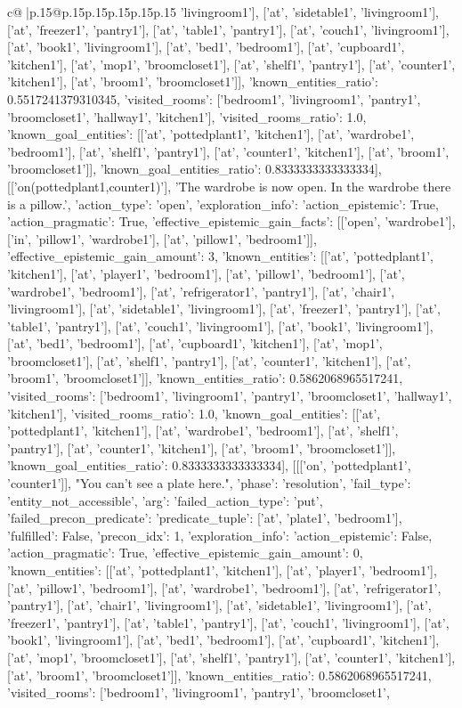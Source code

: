 \documentclass{article}
\begin{document}
{\begin{supertabular}{c@{$\;$}|p{.15\linewidth}@{}p{.15\linewidth}p{.15\linewidth}p{.15\linewidth}p{.15\linewidth}p{.15\linewidth}}
{{{'livingroom1'], ['at', 'sidetable1', 'livingroom1'], ['at', 'freezer1', 'pantry1'], ['at', 'table1', 'pantry1'], ['at', 'couch1', 'livingroom1'], ['at', 'book1', 'livingroom1'], ['at', 'bed1', 'bedroom1'], ['at', 'cupboard1', 'kitchen1'], ['at', 'mop1', 'broomcloset1'], ['at', 'shelf1', 'pantry1'], ['at', 'counter1', 'kitchen1'], ['at', 'broom1', 'broomcloset1']], 'known_entities_ratio': 0.5517241379310345, 'visited_rooms': ['bedroom1', 'livingroom1', 'pantry1', 'broomcloset1', 'hallway1', 'kitchen1'], 'visited_rooms_ratio': 1.0, 'known_goal_entities': [['at', 'pottedplant1', 'kitchen1'], ['at', 'wardrobe1', 'bedroom1'], ['at', 'shelf1', 'pantry1'], ['at', 'counter1', 'kitchen1'], ['at', 'broom1', 'broomcloset1']], 'known_goal_entities_ratio': 0.8333333333333334}}], [['on(pottedplant1,counter1)'], 'The wardrobe is now open. In the wardrobe there is a pillow.', {'action_type': 'open', 'exploration_info': {'action_epistemic': True, 'action_pragmatic': True, 'effective_epistemic_gain_facts': [['open', 'wardrobe1'], ['in', 'pillow1', 'wardrobe1'], ['at', 'pillow1', 'bedroom1']], 'effective_epistemic_gain_amount': 3, 'known_entities': [['at', 'pottedplant1', 'kitchen1'], ['at', 'player1', 'bedroom1'], ['at', 'pillow1', 'bedroom1'], ['at', 'wardrobe1', 'bedroom1'], ['at', 'refrigerator1', 'pantry1'], ['at', 'chair1', 'livingroom1'], ['at', 'sidetable1', 'livingroom1'], ['at', 'freezer1', 'pantry1'], ['at', 'table1', 'pantry1'], ['at', 'couch1', 'livingroom1'], ['at', 'book1', 'livingroom1'], ['at', 'bed1', 'bedroom1'], ['at', 'cupboard1', 'kitchen1'], ['at', 'mop1', 'broomcloset1'], ['at', 'shelf1', 'pantry1'], ['at', 'counter1', 'kitchen1'], ['at', 'broom1', 'broomcloset1']], 'known_entities_ratio': 0.5862068965517241, 'visited_rooms': ['bedroom1', 'livingroom1', 'pantry1', 'broomcloset1', 'hallway1', 'kitchen1'], 'visited_rooms_ratio': 1.0, 'known_goal_entities': [['at', 'pottedplant1', 'kitchen1'], ['at', 'wardrobe1', 'bedroom1'], ['at', 'shelf1', 'pantry1'], ['at', 'counter1', 'kitchen1'], ['at', 'broom1', 'broomcloset1']], 'known_goal_entities_ratio': 0.8333333333333334}}], [[['on', 'pottedplant1', 'counter1']], "You can't see a plate here.", {'phase': 'resolution', 'fail_type': 'entity_not_accessible', 'arg': {'failed_action_type': 'put', 'failed_precon_predicate': {'predicate_tuple': ['at', 'plate1', 'bedroom1'], 'fulfilled': False, 'precon_idx': 1}}, 'exploration_info': {'action_epistemic': False, 'action_pragmatic': True, 'effective_epistemic_gain_amount': 0, 'known_entities': [['at', 'pottedplant1', 'kitchen1'], ['at', 'player1', 'bedroom1'], ['at', 'pillow1', 'bedroom1'], ['at', 'wardrobe1', 'bedroom1'], ['at', 'refrigerator1', 'pantry1'], ['at', 'chair1', 'livingroom1'], ['at', 'sidetable1', 'livingroom1'], ['at', 'freezer1', 'pantry1'], ['at', 'table1', 'pantry1'], ['at', 'couch1', 'livingroom1'], ['at', 'book1', 'livingroom1'], ['at', 'bed1', 'bedroom1'], ['at', 'cupboard1', 'kitchen1'], ['at', 'mop1', 'broomcloset1'], ['at', 'shelf1', 'pantry1'], ['at', 'counter1', 'kitchen1'], ['at', 'broom1', 'broomcloset1']], 'known_entities_ratio': 0.5862068965517241, 'visited_rooms': ['bedroom1', 'livingroom1', 'pantry1', 'broomcloset1', }}}
\end{supertabular}}
\end{document}
